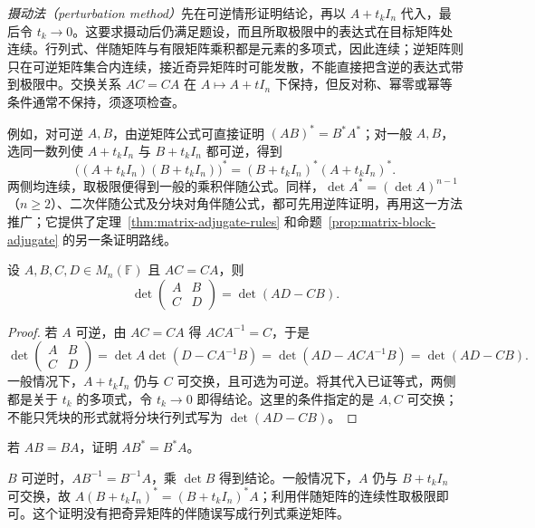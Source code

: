\emph{摄动法（perturbation method）}先在可逆情形证明结论，再以 $A+t_kI_n$ 代入，最后令 $t_k\to0$。这要求摄动后仍满足题设，而且所取极限中的表达式在目标矩阵处连续。行列式、伴随矩阵与有限矩阵乘积都是元素的多项式，因此连续；逆矩阵则只在可逆矩阵集合内连续，接近奇异矩阵时可能发散，不能直接把含逆的表达式带到极限中。交换关系 $AC=CA$ 在 $A\mapsto A+tI_n$ 下保持，但反对称、幂零或幂等条件通常不保持，须逐项检查。

例如，对可逆 $A,B$，由逆矩阵公式可直接证明 $(AB)^*=B^*A^*$；对一般 $A,B$，选同一数列使 $A+t_kI_n$ 与 $B+t_kI_n$ 都可逆，得到
\[
 \bigl((A+t_kI_n)(B+t_kI_n)\bigr)^*
 =(B+t_kI_n)^*(A+t_kI_n)^*.
\]
两侧均连续，取极限便得到一般的乘积伴随公式。同样，$\det A^*=(\det A)^{n-1}$（$n\ge2$）、二次伴随公式及分块对角伴随公式，都可先用逆阵证明，再用这一方法推广；它提供了定理~\ref{thm:matrix-adjugate-rules} 和命题~\ref{prop:matrix-block-adjugate} 的另一条证明路线。

\begin{proposition}
\label{prop:matrix-commuting-block-determinant}
设 $A,B,C,D\in M_n(\mathbb F)$ 且 $AC=CA$，则
\begin{equation}
 \det\begin{pmatrix}A&B\\C&D\end{pmatrix}=\det(AD-CB).
 \label{eq:matrix-commuting-block-determinant}
\end{equation}
\end{proposition}
\begin{proof}
若 $A$ 可逆，由 $AC=CA$ 得 $ACA^{-1}=C$，于是
\[
 \det\begin{pmatrix}A&B\\C&D\end{pmatrix}
 =\det A\det(D-CA^{-1}B)
 =\det(AD-ACA^{-1}B)=\det(AD-CB).
\]
一般情况下，$A+t_kI_n$ 仍与 $C$ 可交换，且可选为可逆。将其代入已证等式，两侧都是关于 $t_k$ 的多项式，令 $t_k\to0$ 即得结论。这里的条件指定的是 $A,C$ 可交换；不能只凭块的形式就将分块行列式写为 $\det(AD-CB)$。
\end{proof}

\begin{example}
\label{ex:matrix-adjugate-commutation}
若 $AB=BA$，证明 $AB^*=B^*A$。
\end{example}
\begin{solve}
$B$ 可逆时，$AB^{-1}=B^{-1}A$，乘 $\det B$ 得到结论。一般情况下，$A$ 仍与 $B+t_kI_n$ 可交换，故 $A(B+t_kI_n)^*=(B+t_kI_n)^*A$；利用伴随矩阵的连续性取极限即可。这个证明没有把奇异矩阵的伴随误写成行列式乘逆矩阵。
\end{solve}

